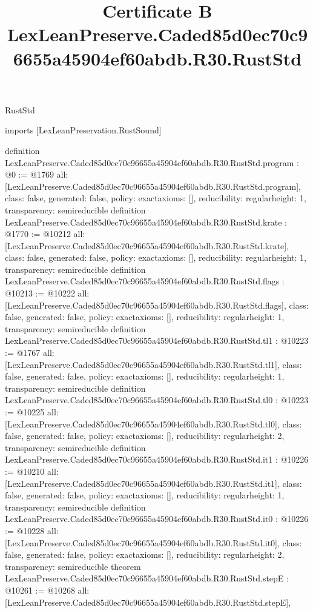 \begin{lexlean}{RustStd}
\title{Certificate B LexLeanPreserve.Caded85d0ec70c96655a45904ef60abdb.R30.RustStd}
\begin{coremodule}
imports [LexLeanPreservation.RustSound]

definition LexLeanPreserve.Caded85d0ec70c96655a45904ef60abdb.R30.RustStd.program : @0 := @1769 {
  all: [LexLeanPreserve.Caded85d0ec70c96655a45904ef60abdb.R30.RustStd.program],
  class: false,
  generated: false,
  policy: exact{axioms: []},
  reducibility: regular{height: 1},
  transparency: semireducible
}
definition LexLeanPreserve.Caded85d0ec70c96655a45904ef60abdb.R30.RustStd.krate : @1770 := @10212 {
  all: [LexLeanPreserve.Caded85d0ec70c96655a45904ef60abdb.R30.RustStd.krate],
  class: false,
  generated: false,
  policy: exact{axioms: []},
  reducibility: regular{height: 1},
  transparency: semireducible
}
definition LexLeanPreserve.Caded85d0ec70c96655a45904ef60abdb.R30.RustStd.flags : @10213 := @10222 {
  all: [LexLeanPreserve.Caded85d0ec70c96655a45904ef60abdb.R30.RustStd.flags],
  class: false,
  generated: false,
  policy: exact{axioms: []},
  reducibility: regular{height: 1},
  transparency: semireducible
}
definition LexLeanPreserve.Caded85d0ec70c96655a45904ef60abdb.R30.RustStd.tl1 : @10223 := @1767 {
  all: [LexLeanPreserve.Caded85d0ec70c96655a45904ef60abdb.R30.RustStd.tl1],
  class: false,
  generated: false,
  policy: exact{axioms: []},
  reducibility: regular{height: 1},
  transparency: semireducible
}
definition LexLeanPreserve.Caded85d0ec70c96655a45904ef60abdb.R30.RustStd.tl0 : @10223 := @10225 {
  all: [LexLeanPreserve.Caded85d0ec70c96655a45904ef60abdb.R30.RustStd.tl0],
  class: false,
  generated: false,
  policy: exact{axioms: []},
  reducibility: regular{height: 2},
  transparency: semireducible
}
definition LexLeanPreserve.Caded85d0ec70c96655a45904ef60abdb.R30.RustStd.it1 : @10226 := @10210 {
  all: [LexLeanPreserve.Caded85d0ec70c96655a45904ef60abdb.R30.RustStd.it1],
  class: false,
  generated: false,
  policy: exact{axioms: []},
  reducibility: regular{height: 1},
  transparency: semireducible
}
definition LexLeanPreserve.Caded85d0ec70c96655a45904ef60abdb.R30.RustStd.it0 : @10226 := @10228 {
  all: [LexLeanPreserve.Caded85d0ec70c96655a45904ef60abdb.R30.RustStd.it0],
  class: false,
  generated: false,
  policy: exact{axioms: []},
  reducibility: regular{height: 2},
  transparency: semireducible
}
theorem LexLeanPreserve.Caded85d0ec70c96655a45904ef60abdb.R30.RustStd.stepE : @10261 := @10268 {
  all: [LexLeanPreserve.Caded85d0ec70c96655a45904ef60abdb.R30.RustStd.stepE],
}
\end{coremodule}
\end{lexlean}
